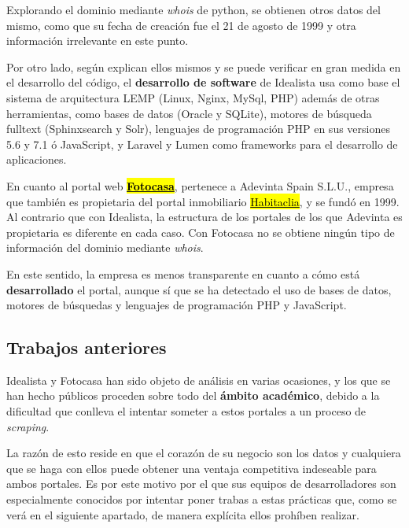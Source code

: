 \documentclass[12pt]{article}
\begin{document}
Explorando el dominio mediante \textit{whois} de python, se obtienen otros datos del mismo, como que su fecha de creación fue el 21 de agosto de 1999 y otra información irrelevante en este punto.

Por otro lado, según explican ellos mismos y se puede verificar en gran medida en el desarrollo del código, el \textbf{desarrollo de software} de Idealista usa como base el sistema de arquitectura LEMP (Linux, Nginx, MySql, PHP) además de otras herramientas, como bases de datos (Oracle y SQLite), motores de búsqueda fulltext (Sphinxsearch y Solr), lenguajes de programación PHP en sus versiones 5.6 y 7.1 ó JavaScript, y Laravel y Lumen como frameworks para el desarrollo de aplicaciones.

En cuanto al portal web \href{https://www.fotocasa.es/es/}{\textbf{\hl{Fotocasa}}}, pertenece a Adevinta Spain S.L.U., empresa que también es propietaria del portal inmobiliario \href{https://www.habitaclia.com/madrid}{\hl{Habitaclia}}, y se fundó en 1999. Al contrario que con Idealista, la estructura de los portales de los que Adevinta es propietaria es diferente en cada caso. Con Fotocasa no se obtiene ningún tipo de información del dominio mediante \textit{whois}. 

En este sentido, la empresa es menos transparente en cuanto a cómo está \textbf{desarrollado} el portal, aunque sí que se ha detectado el uso de bases de datos, motores de búsquedas y lenguajes de programación PHP y JavaScript.

\vspace{-1.5em}\subsection*{Trabajos anteriores}\vspace{-1.0em}

Idealista y Fotocasa han sido objeto de análisis en varias ocasiones, y los que se han hecho públicos proceden sobre todo del \textbf{ámbito académico}, debido a la dificultad que conlleva el intentar someter a estos portales a un proceso de \textit{scraping}.

La razón de esto reside en que el corazón de su negocio son los datos y cualquiera que se haga con ellos puede obtener una ventaja competitiva indeseable para ambos portales. Es por este motivo por el que sus equipos de desarrolladores son especialmente conocidos por intentar poner trabas a estas prácticas que, como se verá en el siguiente apartado, de manera explícita ellos prohíben realizar.
\end{document}

